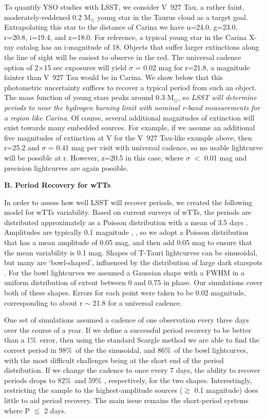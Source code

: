 To quantify YSO studies with LSST, we consider V~927 Tau,
a rather faint, moderately-reddened 0.2 M$_\odot$ young star in the Taurus cloud
as a target goal. Extrapolating this star
to the distance of Carina we have u=24.0, g=23.0, r=20.8, i=19.4, and z=18.0. For reference,
a typical young star in the Carina X-ray catalog has an i-magnitude of 18.
Objects that suffer larger extinctions along the line of sight will
be easiest to observe in the red. The universal cadence option of 2$\times$15 sec
exposures will yield $\sigma$ = 0.02 mag for r=21.8, a magnitude fainter than
V~927 Tau would be in Carina. We show below that this photometric uncertainty
suffices to recover a typical period from such an object. The mass function
of young stars peaks around 0.3 M$_\odot$, so {\it LSST will
determine periods to near the hydrogen burning limit with nominal r-band measurements
for a region like Carina}. Of course, several additional magnitudes of extinction will
exist towards many embedded sources. For example, if we assume an additional five magnitudes
of extinction at V for the V~927 Tau-like example above,
then r=25.2 and $\sigma$ = 0.41 mag per visit with universal cadence,
so no usable lightcurve will be possible at r.
However, z=20.5 in this case, where $\sigma$ $<$ 0.01 mag and precision
lightcurves are again possible.

{\bf B. Period Recovery for wTTs}

In order to assess how well LSST will recover periods, we created the following
model for wTTs variability.  Based on current surveys of wTTs, the periods are
distributed approximately as a Poisson distribution with a mean of 3.5 days
\citep[Affer et al. (2013)]{Affer13}.
Amplitudes are typically 0.1 magnitude \citep[(Grankin et al. 2008)]{ROTOR},
, so we adopt a Poisson distribution
that has a mean amplitude of 0.05 mag, and then add 0.05 mag to ensure that
the mean variability is 0.1 mag. Shapes of T-Tauri lightcurves can be sinusoidal,
but many are `bowl-shaped', influenced by the distribution of large dark starspots
\citep[(Alencar et al. 2010)]{CoRoT}.
For the bowl lightcurves we assumed a Gaussian shape with a FWHM in a uniform
distribution of extent between 0 and 0.75 in phase.
Our simulations cover both of these shapes.
Errors for each point were taken to be 0.02 magnitude, corresponding to
about r $\sim$ 21.8 for a universal cadence.

One set of simulations assumed a cadence of
one observation every three days over the course of a year.
If we define a successful period recovery to be better than a 1\%\ error, then
using the standard Scargle method \citep[(Horne \& Baliunas 1986)]{Scargle}
we are able to find the correct period in
98\%\ of the the sinusoidal, and 86\%\ of the bowl lightcurves, with the most
difficult challenges being at the short end of the period distribution. If we change
the cadence to once every 7 days, the ability to recover periods drops to
82\%\ and 59\% , respectively, for the two shapes. Interestingly, restricting the
sample to the highest-amplitude sources ($\gtrsim$ 0.1 magnitude) does little
to aid period recovery. The main issue remains the short-period systems where
P $\lesssim$ 2 days.

